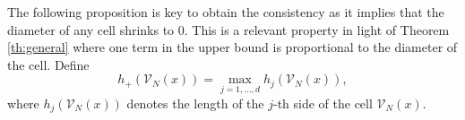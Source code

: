 \documentclass[paper=a4, fontsize=11pt]{scrartcl}
\newcommand{\ind}{\mathds{1}}
\begin{document}


The following proposition is key to obtain the consistency as it implies that the diameter of any cell shrinks to $0$. This is a relevant property in light of Theorem \ref{th:general} where one term in the upper bound is proportional to the diameter of the cell. Define 
$$ h_+(\mathcal{V}_N(x)) = \max_{j=1, \dots, d} h_j(\mathcal{V}_N(x))  ,$$
where $h_j(\mathcal{V}_N(x))$ denotes the length of the $j$-th side of the cell $\mathcal{V}_N(x)$.


\end{document}
